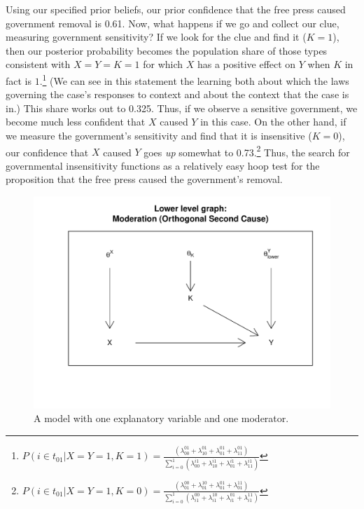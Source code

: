 \documentclass[12pt,]{book}
\let\rmarkdownfootnote\footnote%
\def\footnote{\protect\rmarkdownfootnote}
\begin{document}
Using our specified prior beliefs, our prior confidence that the free press caused government removal is 0.61. Now, what happens if we go and collect our clue, measuring government sensitivity? If we look for the clue and find it (\(K=1\)), then our posterior probability becomes the population share of those types consistent with \(X=Y=K=1\) for which \(X\) has a positive effect on \(Y\) when \(K\) in fact is \(1\).\footnote{\(P(i \in t_{01} | X=Y=1, K=1) = \frac{\left(\lambda_{00}^{01}+\lambda_{10}^{01}+\lambda_{01}^{01}+\lambda_{11}^{01}\right)}{\sum_{i = 0}^1\left(\lambda_{00}^{i1}+\lambda_{10}^{i1}+\lambda_{01}^{i1}+\lambda_{11}^{i1}\right)}\)} (We can see in this statement the learning both about which the laws governing the case's responses to context and about the context that the case is in.) This share works out to 0.325. Thus, if we observe a sensitive government, we become much less confident that \(X\) caused \(Y\) in this case. On the other hand, if we measure the government's sensitivity and find that it is insensitive (\(K=0\)), our confidence that \(X\) caused \(Y\) goes \emph{up} somewhat to 0.73.\footnote{\(P(i \in t_{01} | X=Y=1, K=0) = \frac{\left(\lambda_{01}^{00}+\lambda_{01}^{10}+\lambda_{01}^{01}+\lambda_{01}^{11}\right)}{\sum_{i = 0}^1\left(\lambda_{i1}^{00}+\lambda_{i1}^{10}+\lambda_{i1}^{01}+\lambda_{i1}^{11}\right)}\)} Thus, the search for governmental insensitivity functions as a relatively easy hoop test for the proposition that the free press caused the government's removal.

\begin{figure}

{\centering \includegraphics[width=.7\textwidth]{ii_files/figure-latex/unnamed-chunk-35-1} 

}

\caption{\label{fig:modinf} A model with one explanatory variable and one moderator.}\label{fig:unnamed-chunk-35}
\end{figure}
\end{document}
